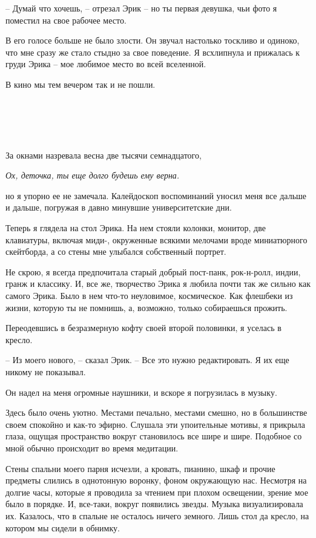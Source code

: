 \documentclass[
]{book}
\begin{document}
-- Думай что хочешь, -- отрезал Эрик -- но ты первая девушка, чьи фото я поместил на свое рабочее место.

В его голосе больше не было злости. Он звучал настолько тоскливо и одиноко, что мне сразу же стало стыдно за свое поведение. Я всхлипнула и прижалась к груди Эрика -- мое любимое место во всей вселенной.

В кино мы тем вечером так и не пошли.

\hypertarget{chapter-94}{%
\chapter{~}\label{chapter-94}}

За окнами назревала весна две тысячи семнадцатого,

\emph{Ох, деточка, ты еще долго будешь ему верна.}

но я упорно ее не замечала. Калейдоскоп воспоминаний уносил меня все дальше и дальше, погружая в давно минувшие университетские дни.

Теперь я глядела на стол Эрика. На нем стояли колонки, монитор, две клавиатуры, включая миди-, окруженные всякими мелочами вроде миниатюрного скейтборда, а со стены мне улыбался собственный портрет.

Не скрою, я всегда предпочитала старый добрый пост-панк, рок-н-ролл, индии, гранж и классику. И, все же, творчество Эрика я любила почти так же сильно как самого Эрика. Было в нем что-то неуловимое, космическое. Как флешбеки из жизни, которую ты не помнишь, а, возможно, только собираешься прожить.

Переодевшись в безразмерную кофту своей второй половинки, я уселась в кресло.

-- Из моего нового, -- сказал Эрик. -- Все это нужно редактировать. Я их еще никому не показывал.

Он надел на меня огромные наушники, и вскоре я погрузилась в музыку.

Здесь было очень уютно. Местами печально, местами смешно, но в большинстве своем спокойно и как-то эфирно. Слушала эти упоительные мотивы, я прикрыла глаза, ощущая пространство вокруг становилось все шире и шире. Подобное со мной обычно происходит во время медитации.

Стены спальни моего парня исчезли, а кровать, пианино, шкаф и прочие предметы слились в однотонную воронку, фоном окружающую нас. Несмотря на долгие часы, которые я проводила за чтением при плохом освещении, зрение мое было в порядке. И, все-таки, вокруг появились звезды. Музыка визуализировала их. Казалось, что в спальне не осталось ничего земного. Лишь стол да кресло, на котором мы сидели в обнимку.
\end{document}
